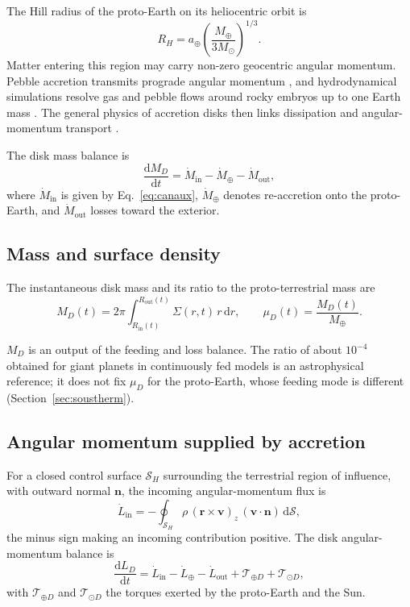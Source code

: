 \documentclass[11pt,a4paper,openany]{report}
\newcommand{\Mt}{M_{\oplus}}
\newcommand{\dd}{\mathrm{d}}
\begin{document}
The Hill radius of the proto-Earth on its heliocentric orbit is
\begin{equation}
R_H=a_\oplus\left(\frac{\Mt}{3M_\odot}\right)^{1/3}.
\label{eq:RH}
\end{equation}
Matter entering this region may carry non-zero geocentric angular momentum. Pebble accretion
transmits prograde angular momentum \cite{JohansenLacerda2010,Visser2020}, and hydrodynamical
simulations resolve gas and pebble flows around rocky embryos up to one Earth mass
\cite{Popovas2018}. The general physics of accretion disks then links dissipation and
angular-momentum transport \cite{Pringle1981}.

The disk mass balance is
\begin{equation}
\frac{\dd M_D}{\dd t}=\dot M_{\mathrm{in}}-\dot M_{\oplus}-\dot M_{\mathrm{out}},
\label{eq:bilanM}
\end{equation}
where $\dot M_{\mathrm{in}}$ is given by Eq.~\eqref{eq:canaux}, $\dot M_\oplus$ denotes re-accretion
onto the proto-Earth, and $\dot M_{\mathrm{out}}$ losses toward the exterior.

\subsection{Mass and surface density}

The instantaneous disk mass and its ratio to the proto-terrestrial mass are
\begin{equation}
M_D(t)=2\pi\int_{R_{\mathrm{in}}(t)}^{R_{\mathrm{out}}(t)}\Sigma(r,t)\,r\,\dd r,
\qquad
\mu_D(t)=\frac{M_D(t)}{\Mt}.
\label{eq:MD}
\end{equation}

\begin{lecture}
$M_D$ is an output of the feeding and loss balance. The ratio of about $10^{-4}$ obtained for giant
planets in continuously fed models \cite{CanupWard2006} is an astrophysical reference; it does not
fix $\mu_D$ for the proto-Earth, whose feeding mode is different (Section~\ref{sec:soustherm}).
\end{lecture}

\subsection{Angular momentum supplied by accretion}

For a closed control surface $\mathcal{S}_H$ surrounding the terrestrial region of influence, with
outward normal $\mathbf{n}$, the incoming angular-momentum flux is
\begin{equation}
\dot L_{\mathrm{in}}=-\oint_{\mathcal{S}_H}\rho\,(\mathbf{r}\times\mathbf{v})_z\,
(\mathbf{v}\cdot\mathbf{n})\,\dd\mathcal{S},
\label{eq:Lin}
\end{equation}
the minus sign making an incoming contribution positive. The disk angular-momentum balance is
\begin{equation}
\frac{\dd L_D}{\dd t}=\dot L_{\mathrm{in}}-\dot L_{\oplus}-\dot L_{\mathrm{out}}
+\mathcal{T}_{\oplus D}+\mathcal{T}_{\odot D},
\label{eq:bilanL}
\end{equation}
with $\mathcal{T}_{\oplus D}$ and $\mathcal{T}_{\odot D}$ the torques exerted by the proto-Earth and
the Sun.
\end{document}
